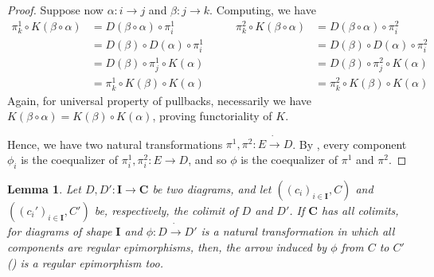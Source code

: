 \documentclass[runningheads,envcountsect]{llncs}
\newcommand{\cat}[1]{\ensuremath{\mathbf{#1}}}
\theoremstyle{plain}
\newtheorem{lemma}[theorem]{Lemma}
\theoremstyle{definition}
\begin{document}
\begin{proof}
        Suppose now $\alpha : i \to j$ and $\beta: j \to k$. Computing, we have
        \[
            \begin{split}
                \pi_k^1 \circ K(\beta \circ \alpha) &= D(\beta \circ \alpha) \circ \pi_i^1 \\
                                                    &= D(\beta) \circ D(\alpha) \circ \pi_i^1 \\
                                                    &= D(\beta) \circ \pi_j^1 \circ K(\alpha) \\
                                                    &= \pi_k^1 \circ K(\beta) \circ K(\alpha)
            \end{split} \qquad
            \begin{split}
                \pi_k^2 \circ K(\beta \circ \alpha) &= D(\beta \circ \alpha) \circ \pi_i^2 \\
                                                    &= D(\beta) \circ D(\alpha) \circ \pi_i^2 \\
                                                    &= D(\beta) \circ \pi_j^2 \circ K(\alpha) \\
                                                    &= \pi_k^2 \circ K(\beta) \circ K(\alpha)
            \end{split}
        \]
        Again, for universal property of pullbacks, necessarily we have $K(\beta \circ \alpha) = K(\beta) \circ K(\alpha)$, proving functoriality of $K$.
   
    
     Hence, we have two natural transformations $\pi^1, \pi^2 : E \dot\to D$. By , every component $\phi_i$ is the coequalizer of $\pi_i^1, \pi_i^2: E \to D$, and so $\phi$ is the coequalizer of $\pi^1$ and $\pi^2$.
\end{proof}

\begin{lemma}\label{lemma:nat_trans_reg_epi_canonical_arrow_reg_epi}
    Let $D, D': \cat{I \to C}$ be two diagrams, and let $((c_i)_{i \in \cat I}, C)$ and $((c_i')_{i\in \cat I}, C')$ be, respectively, the colimit of $D$ and $D'$. If $\cat C$ has all colimits, for diagrams of shape $\cat I$ and $\phi: D \dot\to D'$ is a natural transformation in which all components are regular epimorphisms, then, the arrow induced by $\phi$ from $C$ to $C'$ () is a regular epimorphism too.
\end{lemma}
\end{document}
